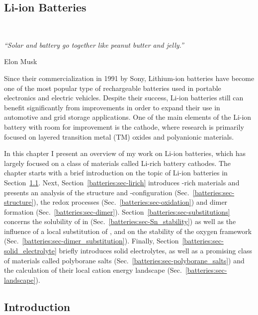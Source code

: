 \begin{refsection} 
 
\chapter{Li-ion Batteries}~\label{chapter:batteries} 
\pagestyle{chapter}

\setlength{\epigraphwidth}{3in} 
\epigraph{\textit{``Solar and battery go together like peanut butter and 
jelly.” }}{Elon Musk} 
\vspace{3em} 
 
Since their commercialization in 1991 by Sony, Lithium-ion batteries have 
become one of the most popular type of rechargeable batteries used in portable 
electronics and electric vehicles. Despite their success, Li-ion batteries 
still can benefit significantly from improvements in order to expand their use in 
automotive and grid storage applications. One of the main elements of the 
Li-ion battery with room for improvement is the cathode, where research is primarily 
focused on layered transition metal (\gls{TM}) oxides and polyanionic materials.  
 
In this chapter I present an overview of my work on Li-ion batteries, which 
has largely focused on a class of materials called Li-rich battery cathodes. 
The chapter starts with a brief introduction on the topic of Li-ion 
batteries in Section~\ref{batteries:sec-intro}. Next, 
Section~\ref{batteries:sec-lirich} introduces -rich materials and 
presents an analysis of the structure and -configuration 
(Sec.~\ref{batteries:sec-structure}), the redox processes 
(Sec.~\ref{batteries:sec-oxidation}) and dimer formation 
(Sec.~\ref{batteries:sec-dimer}). Section~\ref{batteries:sec-substitutions} concerns the solubility of  
in  (Sec.~\ref{batteries:sec-Sn_stability}) as well as the 
influence of a local substitution of ,  and  on the 
stability of the oxygen framework 
(Sec.~\ref{batteries:sec-dimer_substitution}). Finally, 
Section~\ref{batteries:sec-solid_electrolyte} briefly introduces solid 
electrolytes, as well as a promising class of materials called 
polyborane salts (Sec.~\ref{batteries:sec-polyborane_salts}) and the 
calculation of their local cation energy landscape 
(Sec.~\ref{batteries:sec-landscape}).
 
\clearpage 
 
\section{Introduction} \label{batteries:sec-intro} 
 

\end{refsection}
